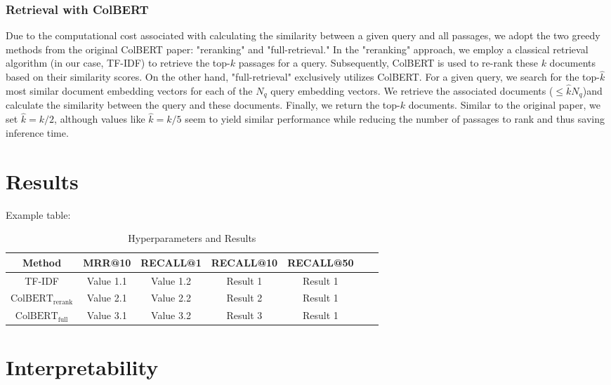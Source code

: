 \documentclass{article}
\begin{document}
\subsubsection{Retrieval with ColBERT}
Due to the computational cost associated with calculating the similarity between a given query and all passages, we adopt the two greedy methods from the original ColBERT paper: "reranking" and "full-retrieval." In the "reranking" approach, we employ a classical retrieval algorithm (in our case, TF-IDF) to retrieve the top-$k$ passages for a query. Subsequently, ColBERT is used to re-rank these $k$ documents based on their similarity scores. On the other hand, "full-retrieval" exclusively utilizes ColBERT. For a given query, we search for the top-$\hat{k}$ most similar document embedding vectors for each of the $N_q$ query embedding vectors. We retrieve the associated documents ($\leq \hat{k}N_q$)and calculate the similarity between the query and these documents. Finally, we return the top-$k$ documents. Similar to the original paper, we set $\hat{k} = k / 2$, although values like $\hat{k} = k / 5$ seem to yield similar performance while reducing the number of passages to rank and thus saving inference time.

\section{Results}


Example table:
\begin{table}[htbp]
    \centering
    \label{tab:hyperparameters}
    \begin{tabular}{ccccccc}
      \toprule
      \textbf{Method} & \textbf{MRR@10}  & \textbf{RECALL@1} & \textbf{RECALL@10} & \textbf{RECALL@50} \\
      \midrule
      TF-IDF & Value 1.1 & Value 1.2 & Result 1  & Result 1 \\
      $\text{ColBERT}_\text{rerank}$ & Value 2.1 & Value 2.2 & Result 2 & Result 1 \\
      $\text{ColBERT}_\text{full}$ & Value 3.1 & Value 3.2 & Result 3 & Result 1 \\
      \bottomrule
    \end{tabular}
    \caption{Hyperparameters and Results}
\end{table}

\section{Interpretability}
\end{document}
